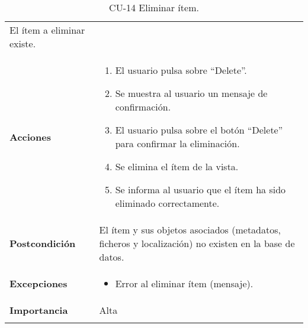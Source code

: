 \begin{longtable}[]{@{}ll@{}}
\begin{minipage}[t]{0.74\columnwidth}
El ítem a eliminar existe.\strut
\end{minipage}\tabularnewline
\begin{minipage}[t]{0.20\columnwidth}\raggedright
\textbf{Acciones}\strut
\end{minipage} & \begin{minipage}[t]{0.74\columnwidth}\raggedright
\begin{enumerate}
\def\labelenumi{\arabic{enumi}.}
\tightlist
\item
  El usuario pulsa sobre ``Delete''.
\item
  Se muestra al usuario un mensaje de confirmación.
\item
  El usuario pulsa sobre el botón ``Delete'' para confirmar la
  eliminación.
\item
  Se elimina el ítem de la vista.
\item
  Se informa al usuario que el ítem ha sido eliminado correctamente.
\end{enumerate}\strut
\end{minipage}\tabularnewline
\begin{minipage}[t]{0.20\columnwidth}\raggedright
\textbf{Postcondición}\strut
\end{minipage} & \begin{minipage}[t]{0.74\columnwidth}\raggedright
El ítem y sus objetos asociados (metadatos, ficheros y localización) no
existen en la base de datos.\strut
\end{minipage}\tabularnewline
\begin{minipage}[t]{0.20\columnwidth}\raggedright
\textbf{Excepciones}\strut
\end{minipage} & \begin{minipage}[t]{0.74\columnwidth}\raggedright
\begin{itemize}
\tightlist
\item
  Error al eliminar ítem (mensaje).
\end{itemize}\strut
\end{minipage}\tabularnewline
\begin{minipage}[t]{0.20\columnwidth}\raggedright
\textbf{Importancia}\strut
\end{minipage} & \begin{minipage}[t]{0.74\columnwidth}\raggedright
Alta\strut
\end{minipage}\tabularnewline
\bottomrule
\caption{CU-14 Eliminar ítem.}
\end{longtable}

